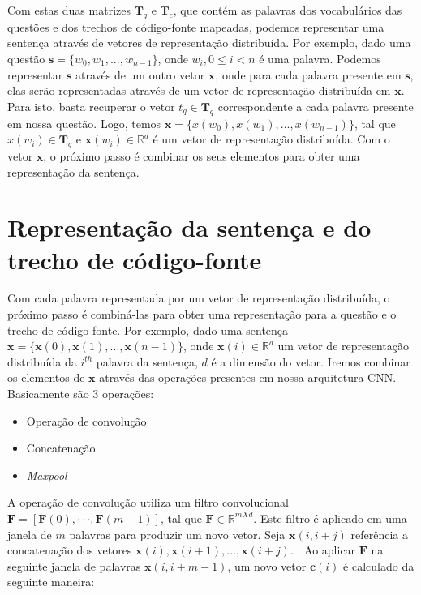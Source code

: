 Com estas duas matrizes $\bm{T}_{q}$ e $\bm{T}_{c}$, que contém as palavras dos vocabulários das questões e dos trechos de código-fonte mapeadas, podemos representar uma sentença através de vetores de representação distribuída. Por exemplo, dado uma questão $\bm{s} = \{ w_{0}, w_{1}, . . ., w_{n - 1}\}$, onde $w_{i}, 0 \leq i < n$ é uma palavra. Podemos representar $\bm{s}$ através de um outro vetor $\bm{x}$, onde para cada palavra presente em $\bm{s}$, elas serão representadas através de um vetor de representação distribuída em $\bm{x}$. Para isto, basta recuperar o vetor $t_{q} \in \bm{T}_{q}$ correspondente a cada palavra presente em nossa questão. Logo, temos $\bm{x} = \{ x(w_{0}), x(w_{1}), . . ., x(w_{n - 1})\}$, tal que $x(w_{i}) \in \bm{T}_{q}$ e $\bm{x}(w_{i}) \in \mathbb{R}^{d}$ é um vetor de representação distribuída. Com o vetor $\bm{x}$, o próximo passo é combinar os seus elementos para obter uma representação da sentença.





\section{Representação da sentença e do trecho de código-fonte}
\label{sec:representacao-sentenca}

Com cada palavra representada por um vetor de representação distribuída, o próximo passo é combiná-las para obter uma representação para a questão e o trecho de código-fonte. Por exemplo, dado uma sentença $\bm{x} = \{ \bm{x}(0), \bm{x}(1), . . ., \bm{x}(n - 1) \}$, onde $\bm{x}(i) \in \mathbb{R}^{d}$ um vetor de representação distribuída da $i^{th}$ palavra da sentença, $d$ é a dimensão do vetor. Iremos combinar os elementos de $\bm{x}$ através das operações presentes em nossa arquitetura CNN. Basicamente são 3 operações:

\begin{itemize}
    \item Operação de convolução
    \item Concatenação
    \item \textit{Maxpool}
\end{itemize}

A operação de convolução utiliza um filtro convolucional $\bm{F}  = [\bm{F}(0),· · ·, \bm{F}(m - 1)]$, tal que $\bm{F} \in \mathbb{R}^{m X d}$. Este filtro é aplicado em uma janela de $m$ palavras para produzir um novo vetor.
Seja $\bm{x}(i, i + j)$ referência a concatenação dos vetores $\bm{x}(i), \bm{x}(i + 1), . . ., \bm{x}(i + j)$. . Ao aplicar $\bm{F}$ na seguinte janela de palavras $\bm{x}(i, i + m - 1)$, um novo vetor $\bm{c}(i)$ é calculado da seguinte maneira:

